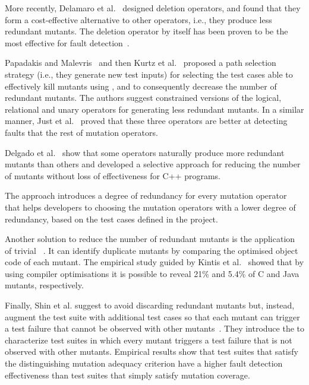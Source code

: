 More recently, Delamaro et al.~\cite{delamaro2014designing} designed deletion operators, and found that they form a cost-effective alternative to other operators, i.e., they produce less redundant mutants. The deletion operator by itself has been proven to be the most effective for fault detection~\cite{delamaro2014designing}.

Papadakis and Malevris~\cite{papadakis2012mutation} and then Kurtz et al.~\cite{kurtz2015static} proposed a path selection strategy (i.e., they generate new test inputs) for selecting the test cases able to effectively kill mutants using , and to consequently decrease the number of redundant mutants. 
The authors suggest constrained versions of the logical, relational and unary operators for generating less redundant mutants. 
In a similar manner, Just et al.~\cite{just2012redundant,just2015higher} proved that these three operators are better at detecting faults that the rest of mutation operators.

Delgado et al.~\cite{delgado2017assessment} show that some operators naturally produce more redundant mutants than others and
developed a selective approach for reducing the number of mutants without loss of effectiveness for C++ programs. 

The approach introduces a degree of redundancy for every mutation operator that helps developers to choosing the mutation operators with a lower degree of redundancy, based on the test cases defined in the project.

Another solution to reduce the number of redundant mutants is the application of trivial ~\cite{papadakis2015trivial, kintis2017detecting,papadakis2019mutation}. 
It can identify duplicate mutants by comparing the optimised object code of each mutant. The empirical study guided by Kintis et al.~\cite{kintis2017detecting} showed that by using compiler optimisations it is possible to reveal 21\% and 5.4\% of C and Java mutants, respectively.


Finally, Shin et al. suggest to avoid discarding redundant mutants but, instead, augment the test suite with additional test cases so that 
each mutant can trigger a test failure that cannot be observed with other mutants~\cite{Shin:TSE:DCriterion:2018}. 
They introduce the  to characterize test suites in which every mutant triggers a test failure that is not observed with other mutants.
Empirical results show that test suites that satisfy the distinguishing mutation adequacy criterion have a higher
 fault detection effectiveness than test suites that simply satisfy mutation coverage.



